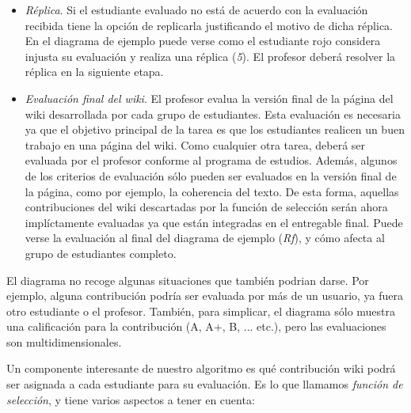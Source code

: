\begin{itemize}
\item \emph{Réplica}. Si el estudiante evaluado no está de acuerdo con la evaluación recibida tiene la opción de replicarla justificando el motivo de dicha réplica. En el diagrama de ejemplo puede verse como el estudiante rojo considera injusta su evaluación y realiza una réplica (\emph{5}). El profesor deberá resolver la réplica en la siguiente etapa.
\item \emph{Evaluación final del wiki}. El profesor evalua la versión final de la página del wiki desarrollada por cada grupo de estudiantes. Esta evaluación es necesaria ya que el objetivo principal de la tarea es que los estudiantes realicen un buen trabajo en una página del wiki. Como cualquier otra tarea, deberá ser evaluada por el profesor conforme al programa de estudios. Además, algunos de los criterios de evaluación sólo pueden ser evaluados en la versión final de la página, como por ejemplo, la coherencia del texto. De esta forma, aquellas contribuciones del wiki descartadas por la función de selección serán ahora implíctamente evaluadas ya que están integradas en el entregable final. Puede verse la evaluación al final del diagrama de ejemplo (\emph{Rf}), y cómo afecta al grupo de estudiantes completo.
\end{itemize}

El diagrama no recoge algunas situaciones que también podrian darse. Por ejemplo, alguna contribución podría ser evaluada por más de un usuario, ya fuera otro estudiante o el profesor. También, para simplicar, el diagrama sólo muestra una calificación para la contribución (A, A+, B, ... etc.), pero las evaluaciones son multidimensionales.

Un componente interesante de nuestro algoritmo es qué contribución wiki podrá ser asignada a cada estudiante para su evaluación. Es lo que llamamos \emph{función de selección}, y tiene varios aspectos a tener en cuenta:

